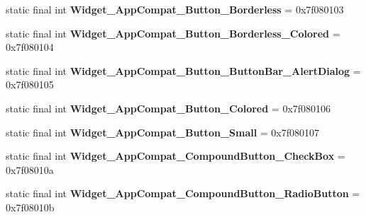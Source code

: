 \begin{DoxyCompactItemize}
\item 
\hypertarget{classandroid_1_1support_1_1v7_1_1appcompat_1_1_r_1_1style_a5539248d2625f20d83f4a1f93cc576b2}{}static final int {\bfseries Widget\+\_\+\+App\+Compat\+\_\+\+Button\+\_\+\+Borderless} = 0x7f080103\label{classandroid_1_1support_1_1v7_1_1appcompat_1_1_r_1_1style_a5539248d2625f20d83f4a1f93cc576b2}

\item 
\hypertarget{classandroid_1_1support_1_1v7_1_1appcompat_1_1_r_1_1style_a610a30199ff6d78914f732725e62f88d}{}static final int {\bfseries Widget\+\_\+\+App\+Compat\+\_\+\+Button\+\_\+\+Borderless\+\_\+\+Colored} = 0x7f080104\label{classandroid_1_1support_1_1v7_1_1appcompat_1_1_r_1_1style_a610a30199ff6d78914f732725e62f88d}

\item 
\hypertarget{classandroid_1_1support_1_1v7_1_1appcompat_1_1_r_1_1style_a9caf7ffbeb017b5b7c700450aeb0e09f}{}static final int {\bfseries Widget\+\_\+\+App\+Compat\+\_\+\+Button\+\_\+\+Button\+Bar\+\_\+\+Alert\+Dialog} = 0x7f080105\label{classandroid_1_1support_1_1v7_1_1appcompat_1_1_r_1_1style_a9caf7ffbeb017b5b7c700450aeb0e09f}

\item 
\hypertarget{classandroid_1_1support_1_1v7_1_1appcompat_1_1_r_1_1style_aa5cdb819e242c5005d54d0431f3e9d60}{}static final int {\bfseries Widget\+\_\+\+App\+Compat\+\_\+\+Button\+\_\+\+Colored} = 0x7f080106\label{classandroid_1_1support_1_1v7_1_1appcompat_1_1_r_1_1style_aa5cdb819e242c5005d54d0431f3e9d60}

\item 
\hypertarget{classandroid_1_1support_1_1v7_1_1appcompat_1_1_r_1_1style_a021c9d5ac246c4c6c0cc59f83d925439}{}static final int {\bfseries Widget\+\_\+\+App\+Compat\+\_\+\+Button\+\_\+\+Small} = 0x7f080107\label{classandroid_1_1support_1_1v7_1_1appcompat_1_1_r_1_1style_a021c9d5ac246c4c6c0cc59f83d925439}

\item 
\hypertarget{classandroid_1_1support_1_1v7_1_1appcompat_1_1_r_1_1style_a816734eecf98d5be30371c10bbdebcaf}{}static final int {\bfseries Widget\+\_\+\+App\+Compat\+\_\+\+Compound\+Button\+\_\+\+Check\+Box} = 0x7f08010a\label{classandroid_1_1support_1_1v7_1_1appcompat_1_1_r_1_1style_a816734eecf98d5be30371c10bbdebcaf}

\item 
\hypertarget{classandroid_1_1support_1_1v7_1_1appcompat_1_1_r_1_1style_a84b6c8ceee6e9b5a6314f7869f841202}{}static final int {\bfseries Widget\+\_\+\+App\+Compat\+\_\+\+Compound\+Button\+\_\+\+Radio\+Button} = 0x7f08010b\label{classandroid_1_1support_1_1v7_1_1appcompat_1_1_r_1_1style_a84b6c8ceee6e9b5a6314f7869f841202}


\end{DoxyCompactItemize}
